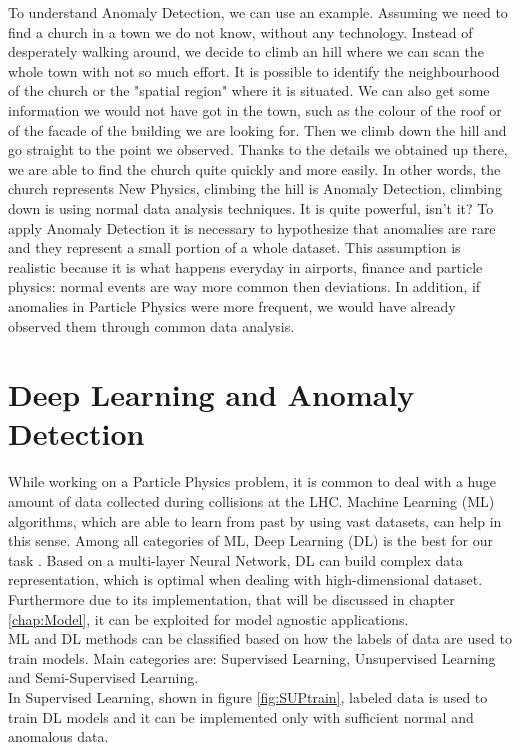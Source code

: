 \noindent To understand Anomaly Detection, we can use an example. Assuming we need to find a church in a town we do not know, without any technology. Instead of desperately walking around, we decide to climb an hill where we can scan the whole town with not so much effort. It is possible to identify the neighbourhood of the church or the "spatial region" where it is situated. We can also get some information we would not have got in the town, such as the colour of the roof or of the facade of the building we are looking for. Then we climb down the hill and go straight to the point we observed. Thanks to the details we obtained up there, we are able to find the church quite quickly and more easily. In other words, the church represents New Physics, climbing the hill is Anomaly Detection, climbing down is using normal data analysis techniques. It is quite powerful, isn't it? To apply Anomaly Detection it is necessary to hypothesize that anomalies are rare and they represent a small portion of a whole dataset. This assumption is realistic because it is what happens everyday in airports, finance and particle physics: normal events are way more common then deviations. In addition, if anomalies in Particle Physics were more frequent, we would have already observed them through common data analysis.


\section{Deep Learning and Anomaly Detection}\label{sec:DLforAD}
While working on a Particle Physics problem, it is common to deal with a huge amount of data collected during collisions at the LHC. Machine Learning (ML) algorithms, which are able to learn from past by using vast datasets, can help in this sense. Among all categories of ML, Deep Learning (DL) is the best for our task \cite{LHCOlympics}. Based on a multi-layer Neural Network, DL can build complex data representation, which is optimal when dealing with high-dimensional dataset. Furthermore due to its implementation, that will be discussed in chapter \ref{chap:Model}, it can be exploited for model agnostic applications. \cite{ML4ADHEP}\\
ML and DL methods can be classified based on how the labels of data are used to train models. Main categories are: Supervised Learning, Unsupervised Learning and Semi-Supervised Learning.\cite{DLforAD}\\
In Supervised Learning, shown in figure \ref{fig:SUPtrain}, labeled data is used to train DL models and it can be implemented only with sufficient normal and anomalous data.

